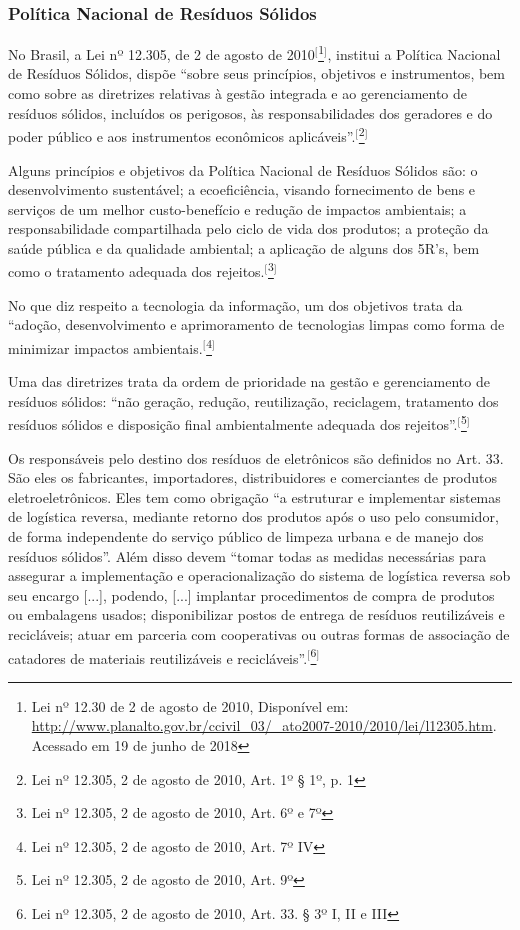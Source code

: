 \subsubsection{Política Nacional de Resíduos Sólidos}

No Brasil, a Lei nº 12.305, de 2 de agosto de 2010$^{[}$\footnote{Lei nº 12.30 de 2 de agosto de 2010, Disponível em: \url{http://www.planalto.gov.br/ccivil_03/_ato2007-2010/2010/lei/l12305.htm}. Acessado em 19 de junho de 2018}$^{]}$, institui a Política Nacional de Resíduos Sólidos, dispõe ``sobre seus princípios, objetivos e instrumentos, bem como sobre as diretrizes relativas à gestão integrada e ao gerenciamento de resíduos sólidos, incluídos os perigosos, às responsabilidades dos geradores e do poder público e aos instrumentos econômicos aplicáveis''.$^{[}$\footnote{Lei nº 12.305, 2 de agosto de 2010, Art. 1º  § 1º, p. 1}$^{]}$

Alguns princípios e objetivos da Política Nacional de Resíduos Sólidos são: o desenvolvimento sustentável; a ecoeficiência, visando fornecimento de bens e serviços de um melhor custo-benefício e redução de impactos ambientais; a responsabilidade compartilhada pelo ciclo de vida dos produtos; a proteção da saúde pública e da qualidade ambiental; a aplicação de alguns dos 5R’s, bem como o tratamento adequada dos rejeitos.$^{[}$\footnote{Lei nº 12.305, 2 de agosto de 2010, Art. 6º e 7º}$^{]}$

No que diz respeito a tecnologia da informação, um dos objetivos trata da “adoção, desenvolvimento e aprimoramento de tecnologias limpas como forma de minimizar impactos ambientais.$^{[}$\footnote{Lei nº 12.305, 2 de agosto de 2010, Art. 7º IV}$^{]}$

Uma das diretrizes trata da ordem de prioridade na gestão e gerenciamento de resíduos sólidos: “não geração, redução, reutilização, reciclagem, tratamento dos resíduos sólidos e disposição final ambientalmente adequada dos rejeitos”.$^{[}$\footnote{Lei nº 12.305, 2 de agosto de 2010, Art. 9º}$^{]}$

Os responsáveis pelo destino dos resíduos de eletrônicos são definidos no Art. 33. São eles os fabricantes, importadores, distribuidores e comerciantes de produtos eletroeletrônicos. Eles tem como obrigação “a estruturar e implementar sistemas de logística reversa, mediante retorno dos produtos após o uso pelo consumidor, de forma independente do serviço público de limpeza urbana e de manejo dos resíduos sólidos”. Além disso devem “tomar todas as medidas necessárias para assegurar a implementação e operacionalização do sistema de logística reversa sob seu encargo [...], podendo, [...] implantar procedimentos de compra de produtos ou embalagens usados; disponibilizar postos de entrega de resíduos reutilizáveis e recicláveis; atuar em parceria com cooperativas ou outras formas de associação de catadores de materiais reutilizáveis e recicláveis”.$^{[}$\footnote{Lei nº 12.305, 2 de agosto de 2010, Art. 33. § 3º I, II e III}$^{]}$

